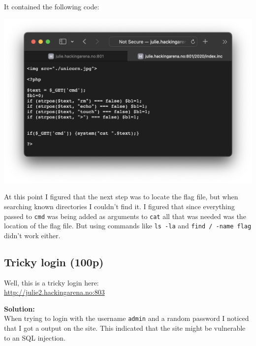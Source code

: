 It contained the following code:

\begin{center}
    \includegraphics[width=15cm]{img/Web hacking/Unicorn 1/Screenshot 2023-11-24 at 22.17.43.png}
\end{center}

At this point I figured that the next step was to locate the flag file, but when searching known directories I couldn't find it.
I figured that since everything passed to \texttt{cmd} was being added as arguments to \texttt{cat} all that was needed was the location of the flag file.
But using commands like \texttt{ls -la} and \texttt{find / -name flag} didn't work either.

\newpage
\subsection{Tricky login (100p)}
\addtocounter{points}{100}
Well, this is a tricky login here: 
\\\url{http://julie2.hackingarena.no:803}

\textbf{Solution:}\\
When trying to login with the username \texttt{admin} and a random password I noticed that I got a output on the site. This indicated that the site might be vulnerable to an SQL injection.

